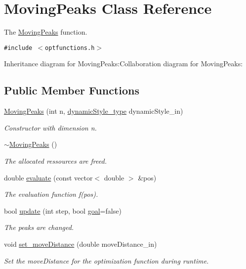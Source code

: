 \hypertarget{classMovingPeaks}{
\section{MovingPeaks Class Reference}
\label{classMovingPeaks}
}
The \hyperlink{classMovingPeaks}{MovingPeaks} function.  


{\tt \#include $<$optfunctions.h$>$}

Inheritance diagram for MovingPeaks:Collaboration diagram for MovingPeaks:\subsection*{Public Member Functions}
\begin{CompactItemize}
\item 
\hyperlink{classMovingPeaks_d5de60c6396d5280e04530e29b9199c5}{MovingPeaks} (int n, \hyperlink{optfunctions_8h_ae9aa3a5dd199a43e77abc2cccf4477e}{dynamicStyle\_\-type} dynamicStyle\_\-in)
\begin{CompactList}\small\item\em Constructor with dimension n. \item\end{CompactList}\item 
\hyperlink{classMovingPeaks_672ff5eb4561c402f64d5c8c73f2cc84}{$\sim$MovingPeaks} ()
\begin{CompactList}\small\item\em The allocated ressources are freed. \item\end{CompactList}\item 
double \hyperlink{classMovingPeaks_6f7165d8ab1b805ff2e3b6cb3df8b7f3}{evaluate} (const vector$<$ double $>$ \&pos)
\begin{CompactList}\small\item\em The evaluation function f(pos). \item\end{CompactList}\item 
bool \hyperlink{classMovingPeaks_84fcf2d3c8600f0dcd7f512ae70c19b4}{update} (int step, bool \hyperlink{classFunction_d9eec4e429707542493d16d83fcb7f54}{goal}=false)
\begin{CompactList}\small\item\em The peaks are changed. \item\end{CompactList}\item 
void \hyperlink{classMovingPeaks_eb39c06b043a569f8971fb5e98d2f63e}{set\_\-moveDistance} (double moveDistance\_\-in)
\begin{CompactList}\small\item\em Set the moveDistance for the optimization function during runtime. \item\end{CompactList}\end{CompactItemize}


